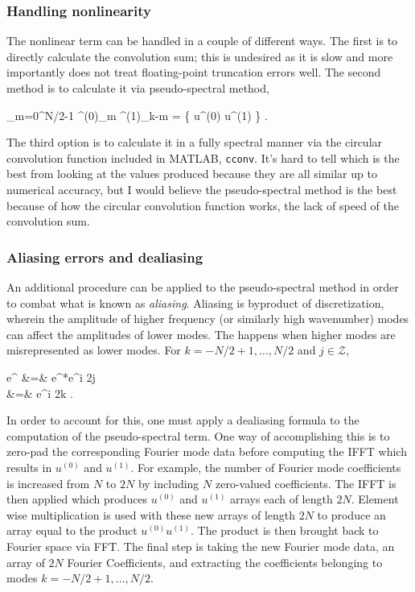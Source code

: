 \subsubsection{Handling nonlinearity}
\label{sect:MNGnonlin}


The nonlinear term can be handled in a couple of different ways. The first is to directly calculate the convolution sum; this is undesired as it is slow and more importantly does not treat floating-point truncation errors well. The second method is to calculate it via pseudo-spectral method,

\beq
\sum_{m=0}^{N/2-1} \Fu^{(0)}_m \Fu^{(1)}_{k-m} =   \left\{ u^{(0)} u^{(1)} \right\} .
\label{e-MNGre13}
\eeq

The third option is to calculate it in a fully spectral manner via the circular convolution function included in MATLAB, \texttt{cconv}. It's hard to tell which is the best from looking at the values produced because they are all similar up to numerical accuracy, but I would believe the pseudo-spectral method is the best because of how the circular convolution function works, the lack of speed of the convolution sum.

\subsubsection{Aliasing errors and dealiasing}
\label{sect:MNGalias}

An additional procedure can be applied to the pseudo-spectral method in order to combat what is known as \textit{aliasing}. Aliasing is byproduct of discretization, wherein the amplitude of higher frequency (or similarly high wavenumber) modes can affect the amplitudes of lower modes. The happens when higher modes are misrepresented as lower modes. For $k = -N/2+1, \ldots, N/2$ and  $j \in \mathcal{Z}$,

\bea
e^{} &=& e^{}*e^{i 2\pi j}\\
 &=& e^{i 2\pi k }. \nonumber
\eea

In order to account for this, one must apply a dealiasing formula to the computation of the pseudo-spectral term. One way of accomplishing this is to zero-pad the corresponding Fourier mode data before computing the IFFT which results in $u^{(0)}$ and $u^{(1)}$. For example, the number of Fourier mode coefficients is increased from $N$ to $2N$ by including $N$ zero-valued coefficients. The IFFT is then applied which produces $u^{(0)}$ and $u^{(1)}$ arrays each of length $2N$. Element wise multiplication is used with these new arrays of length $2N$ to produce an array equal to the product $u^{(0)} u^{(1)}$. The product is then brought back to Fourier space via FFT. The final step is taking the new Fourier mode data, an array of $2N$ Fourier Coefficients, and extracting the coefficients belonging to modes $k = -N/2+1, \ldots, N/2$.

